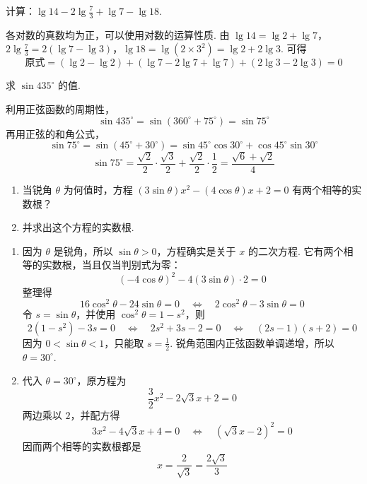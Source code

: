 \begin{problem}
计算：\( \lg14-2\lg\frac{7}{3}+\lg7-\lg18 \).
\end{problem}

\begin{solution}
各对数的真数均为正，可以使用对数的运算性质. 由
\(\lg14=\lg2+\lg7\)，\(2\lg\frac{7}{3}=2\left(\lg7-\lg3\right)\)，\(\lg18=\lg\left(2\times3^2\right)=\lg2+2\lg3\).
可得
\[
\text{原式}=\left(\lg2-\lg2\right)+\left(\lg7-2\lg7+\lg7\right)
 +\left(2\lg3-2\lg3\right)=0
\]
\end{solution}

\begin{problem}
求 \(\sin435^\circ\) 的值.
\end{problem}

\begin{solution}
利用正弦函数的周期性，
\[
\sin435^\circ=\sin\left(360^\circ+75^\circ\right)=\sin75^\circ
\]
再用正弦的和角公式，
\[
\sin75^\circ=\sin\left(45^\circ+30^\circ\right)
 =\sin45^\circ\cos30^\circ+\cos45^\circ\sin30^\circ
\]
\[
\sin75^\circ=\frac{\sqrt{2}}{2}\cdot\frac{\sqrt{3}}{2}
 +\frac{\sqrt{2}}{2}\cdot\frac{1}{2}
 =\frac{\sqrt{6}+\sqrt{2}}{4}
\]
\end{solution}

\begin{problem}
\begin{enumerate}
    \item 当锐角 \(\theta\) 为何值时，方程 \( \left( 3\sin\theta \right)x^2-\left( 4\cos\theta \right)x+2=0 \) 有两个相等的实数根？
    \item 并求出这个方程的实数根.
\end{enumerate}
\end{problem}

\begin{solution}
\begin{enumerate}
    \item 因为 \(\theta\) 是锐角，所以 \(\sin\theta>0\)，方程确实是关于 \(x\) 的二次方程. 它有两个相等的实数根，当且仅当判别式为零：
    \[
    \left(-4\cos\theta\right)^2-4\left(3\sin\theta\right)\cdot2=0
    \]
    整理得
    \[
    16\cos^2\theta-24\sin\theta=0
    \quad\Longleftrightarrow\quad
    2\cos^2\theta-3\sin\theta=0
    \]
    令 \(s=\sin\theta\)，并使用 \(\cos^2\theta=1-s^2\)，则
    \[
    2(1-s^2)-3s=0
    \quad\Longleftrightarrow\quad
    2s^2+3s-2=0
    \quad\Longleftrightarrow\quad
    (2s-1)(s+2)=0
    \]
    因为 \(0<\sin\theta<1\)，只能取 \(s=\frac{1}{2}\). 锐角范围内正弦函数单调递增，所以 \(\theta=30^\circ\).

    \item 代入 \(\theta=30^\circ\)，原方程为
    \[
    \frac{3}{2}x^2-2\sqrt{3}x+2=0
    \]
    两边乘以 \(2\)，并配方得
    \[
    3x^2-4\sqrt{3}x+4=0
    \quad\Longleftrightarrow\quad
    \left(\sqrt{3}x-2\right)^2=0
    \]
    因而两个相等的实数根都是
    \[
    x=\frac{2}{\sqrt{3}}=\frac{2\sqrt{3}}{3}
    \]
\end{enumerate}
\end{solution}


